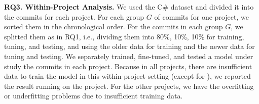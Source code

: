 
\noindent\textbf{RQ3. Within-Project Analysis.}
We used the C\# dataset and divided it into the commits for each
project. For each group $G$ of commits for one project, we sorted them
in the chronological order. For the commits in each group $G$, we
splitted them as in RQ1, i.e., dividing them into 80\%, 10\%, 10\% for
training, tuning, and testing, and using the older data for training
and the newer data for tuning and testing.
%
We separately trained, fine-tuned, and tested a model under study the
commits in each project. Because in all projects, there are
insufficient data to train the model in this within-project setting
(except for ), we reported the result running on
the  project. For the other projects, we have the
overfitting or underfitting problems due to insufficient training
data.





